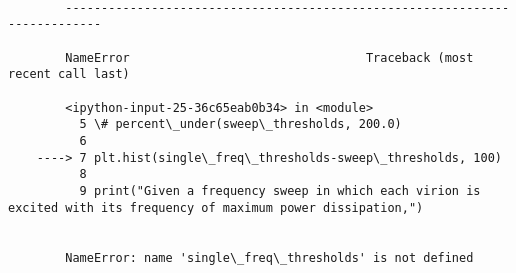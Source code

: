 \documentclass[11pt]{article}
\makeatletter
\newcommand{\boxspacing}{\kern\kvtcb@left@rule\kern\kvtcb@boxsep}
\newcommand{\prompt}[4]{
        \ttfamily\llap{{\color{#2}[#3]:\hspace{3pt}#4}}\vspace{-\baselineskip}
    }
\makeatother
\begin{document}
    \begin{Verbatim}[commandchars=\\\{\}]

        ---------------------------------------------------------------------------

        NameError                                 Traceback (most recent call last)

        <ipython-input-25-36c65eab0b34> in <module>
          5 \# percent\_under(sweep\_thresholds, 200.0)
          6 
    ----> 7 plt.hist(single\_freq\_thresholds-sweep\_thresholds, 100)
          8 
          9 print("Given a frequency sweep in which each virion is excited with its frequency of maximum power dissipation,")


        NameError: name 'single\_freq\_thresholds' is not defined

    \end{Verbatim}

    \begin{tcolorbox}[breakable, size=fbox, boxrule=1pt, pad at break*=1mm,colback=cellbackground, colframe=cellborder]
\prompt{In}{incolor}{ }{\boxspacing}
\begin{Verbatim}[commandchars=\\\{\}]

\end{Verbatim}
\end{tcolorbox}


    
    
    
\end{document}
